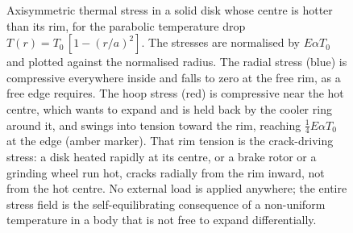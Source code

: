 \begin{figure}[htbp]
\centering
{}
\caption[Thermal stress in a heated disk]{Axisymmetric thermal stress in a
solid disk whose centre is hotter than its rim, for the parabolic
temperature drop $T(r)=T_0\,[1-(r/a)^2]$. The stresses are normalised by
$E\alpha T_0$ and plotted against the normalised radius. The radial stress
(blue) is compressive everywhere inside and falls to zero at the free rim,
as a free edge requires. The hoop stress (red) is compressive near the hot
centre, which wants to expand and is held back by the cooler ring around it,
and swings into tension toward the rim, reaching $\tfrac{1}{4}E\alpha T_0$ at
the edge (amber marker). That rim tension is the crack-driving stress: a
disk heated rapidly at its centre, or a brake rotor or a grinding wheel run
hot, cracks radially from the rim inward, not from the hot centre. No
external load is applied anywhere; the entire stress field is the
self-equilibrating consequence of a non-uniform temperature in a body that
is not free to expand differentially.}
\label{fig:vol03ch09:thermal-disk}
\end{figure}
